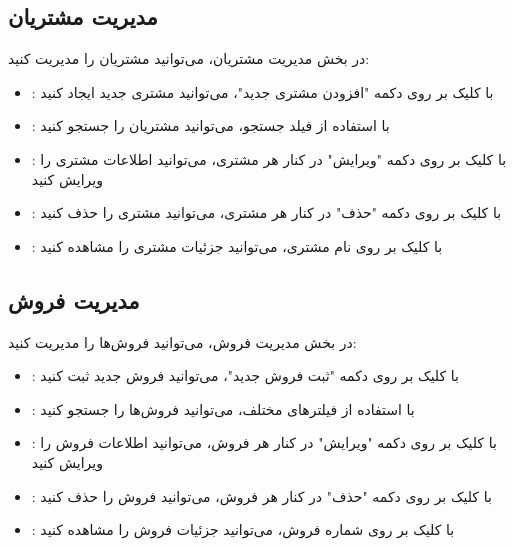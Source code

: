 \documentclass[letterpaper,10pt,english]{sphinxmanual}
\begin{document}
\subsection{مدیریت مشتریان}
\label{\detokenize{user_guide/index:id6}}
\sphinxAtStartPar
در بخش مدیریت مشتریان، می‌توانید مشتریان را مدیریت کنید:
\begin{itemize}
\item {} 
\sphinxAtStartPar
{}: با کلیک بر روی دکمه "افزودن مشتری جدید"، می‌توانید مشتری جدید ایجاد کنید

\item {} 
\sphinxAtStartPar
{}: با استفاده از فیلد جستجو، می‌توانید مشتریان را جستجو کنید

\item {} 
\sphinxAtStartPar
{}: با کلیک بر روی دکمه "ویرایش" در کنار هر مشتری، می‌توانید اطلاعات مشتری را ویرایش کنید

\item {} 
\sphinxAtStartPar
{}: با کلیک بر روی دکمه "حذف" در کنار هر مشتری، می‌توانید مشتری را حذف کنید

\item {} 
\sphinxAtStartPar
{}: با کلیک بر روی نام مشتری، می‌توانید جزئیات مشتری را مشاهده کنید

\end{itemize}


\subsection{مدیریت فروش}
\label{\detokenize{user_guide/index:id7}}
\sphinxAtStartPar
در بخش مدیریت فروش، می‌توانید فروش‌ها را مدیریت کنید:
\begin{itemize}
\item {} 
\sphinxAtStartPar
{}: با کلیک بر روی دکمه "ثبت فروش جدید"، می‌توانید فروش جدید ثبت کنید

\item {} 
\sphinxAtStartPar
{}: با استفاده از فیلترهای مختلف، می‌توانید فروش‌ها را جستجو کنید

\item {} 
\sphinxAtStartPar
{}: با کلیک بر روی دکمه "ویرایش" در کنار هر فروش، می‌توانید اطلاعات فروش را ویرایش کنید

\item {} 
\sphinxAtStartPar
{}: با کلیک بر روی دکمه "حذف" در کنار هر فروش، می‌توانید فروش را حذف کنید

\item {} 
\sphinxAtStartPar
{}: با کلیک بر روی شماره فروش، می‌توانید جزئیات فروش را مشاهده کنید

\end{itemize}
\end{document}
